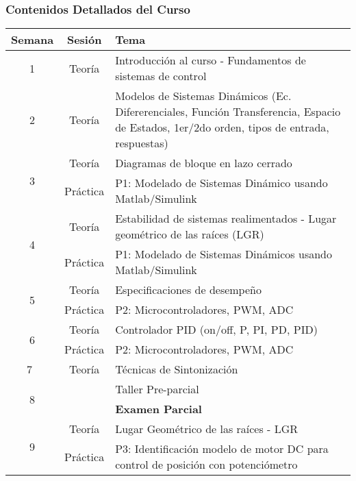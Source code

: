 \documentclass[aspectratio=169,handout]{beamer}
\theoremstyle{definition}
\theoremstyle{plain}
\theoremstyle{remark}
\begin{document}
\begin{frame}[c]\frametitle{Contenidos Detallados del Curso}
\centering
\scriptsize
\begin{tabular}{c|c|p{11cm}}
  \textbf{Semana} & \textbf{Sesión} & \textbf{Tema} \\
  \hline
  1  & Teoría & Introducción al curso - Fundamentos de sistemas de control  \\
  \hline
  2  & Teoría & Modelos de Sistemas Dinámicos (Ec. Difererenciales, Función Transferencia, Espacio de Estados, 1er/2do orden, tipos de entrada, respuestas) \\
  \hline
  \multirow{2}{*}{3}  & Teoría     & Diagramas de bloque en lazo cerrado\\
                      & Práctica   & P1: Modelado de Sistemas Dinámico usando Matlab/Simulink \\
  \hline
  \multirow{2}{*}{4}  & Teoría     & Estabilidad de sistemas realimentados - Lugar geométrico de las raíces (LGR) \\
                      & Práctica   & P1: Modelado de Sistemas Dinámicos usando Matlab/Simulink \\
  \hline
  \multirow{2}{*}{5}  & Teoría     & Especificaciones de desempeño \\
                      & Práctica   & P2: Microcontroladores, PWM, ADC \\
  \hline
  \multirow{2}{*}{6}  & Teoría     & Controlador PID (on/off, P, PI, PD, PID) \\
                      & Práctica   & P2: Microcontroladores, PWM, ADC \\
  \hline
  7  & Teoría & Técnicas de Sintonización \\
  \hline
  \multirow{2}{*}{8}  &            & Taller Pre-parcial \\
                      &            & \textbf{Examen Parcial} \\
  \hline
  \multirow{2}{*}{9}  & Teoría     & Lugar Geométrico de las raíces - LGR \\
                      & Práctica   & P3: Identificación modelo de motor DC para control de posición con potenciómetro \\
\end{tabular}
\end{frame}
\end{document}
